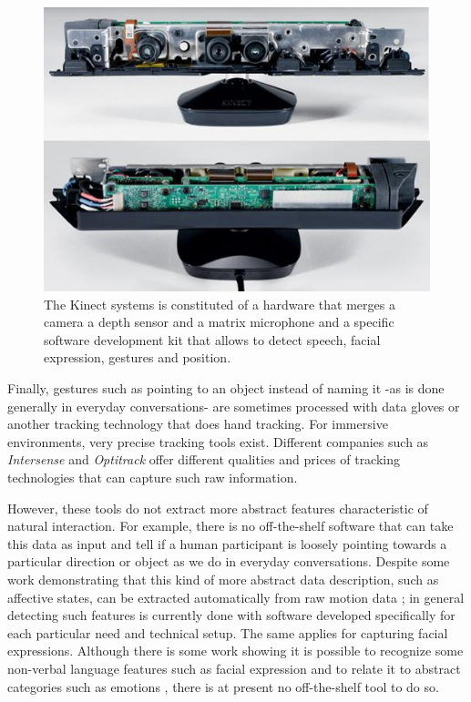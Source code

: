 \documentclass[
		twoside,openright,titlepage,numbers=noenddot,manychapters,
		headinclude,%
                footinclude=false,cleardoublepage=empty,
                BCOR=5mm,
		fontsize=11pt, %
                 enabledeprecatedfontcommands]{scrreprt}
\begin{document}
\begin{figure}[]
\begin{center}
\includegraphics[width=12cm]{figures/insidekinect.jpg}
\caption{ The Kinect systems is constituted of a hardware that merges a camera a depth sensor and a matrix microphone and a specific software development kit that allows to detect speech, facial expression, gestures and position. %
 }
\label{fig_kinect}
\end{center}
\end{figure}



Finally, gestures such as pointing to an object instead of naming it -as is done generally in everyday conversations- are sometimes processed with data gloves or another tracking technology that does hand tracking. For immersive environments, very precise tracking tools exist. Different companies such as \emph{Intersense} and \emph{Optitrack} offer different qualities and prices of tracking technologies that can capture such raw information. 

However, these tools do not extract more abstract features characteristic of natural interaction. For example, there is no off-the-shelf software that can take this data as input and tell if a human participant is loosely pointing towards a particular direction or object as we do in everyday conversations. Despite some work demonstrating that this kind of more abstract data description, such as affective states, can be extracted automatically from raw motion data \cite[]{bernhardt2007detecting}; in general detecting such features is currently done with software developed specifically for each particular need and technical setup. The same applies for capturing facial expressions. Although there is some work showing it is possible to recognize some non-verbal language features such as facial expression and to relate it to abstract categories such as emotions \cite[]{el2004real}, there is at present no off-the-shelf tool to do so. 
\end{document}
